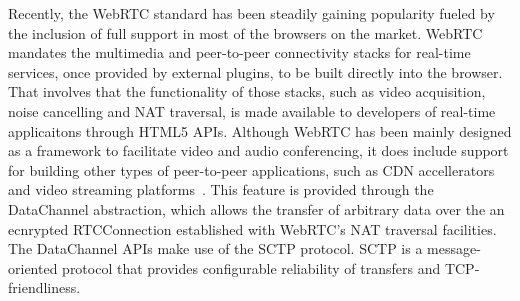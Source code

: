 \documentclass{sig-alternate}
\begin{document}


Recently, the WebRTC standard has been steadily gaining popularity fueled by the inclusion
of full support in most of the browsers on the market. WebRTC mandates the multimedia and
peer-to-peer connectivity stacks for real-time services, once provided by external
plugins, to be built directly into the browser. That involves that the functionality of
those stacks, such as video acquisition, noise cancelling and NAT traversal, is made
available to developers of real-time applicaitons through HTML5 APIs. Although WebRTC has
been mainly designed as a framework to facilitate video and audio conferencing, it does
include support for building other types of peer-to-peer applications, such as CDN
accellerators~\cite{} and video streaming platforms~\cite{}. This feature is provided
through the DataChannel abstraction, which allows the transfer of arbitrary data over the
an ecnrypted RTCConnection established with WebRTC's NAT traversal facilities. The
DataChannel APIs make use of the SCTP protocol. SCTP is a message-oriented protocol that
provides configurable reliability of transfers and TCP-friendliness.







\end{document}
